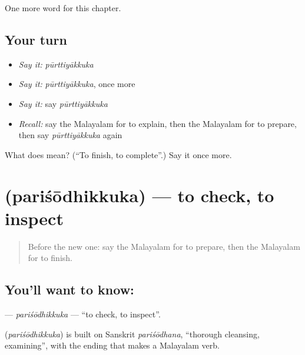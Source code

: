 \begin{grammarlens}[title={What you've built}]
One more word for this chapter.
\end{grammarlens}

\subsection*{Your turn}
\begin{itemize}
\raggedright
  \item \emph{Say it:} \emph{pūrttiyākkuka}
  \item \emph{Say it:} \emph{pūrttiyākkuka}, once more
  \item \emph{Say it:} say \emph{pūrttiyākkuka}
  \item \emph{Recall:} say the Malayalam for to explain, then the Malayalam for to prepare, then say \emph{pūrttiyākkuka} again
\end{itemize}

\begin{tcolorbox}[breakable,colback=teal!4,colframe=teal!35!black,title={Before you move on}]
What does  mean? (\textquotedblleft{}To finish, to complete\textquotedblright{}.) Say it once more.
\end{tcolorbox}
\section[\texorpdfstring{\ml{പരിശോധിക്കുക} (pariśōdhikkuka)}{പരിശോധിക്കുക (pariśōdhikkuka)}]{ (pariśōdhikkuka) — to check, to inspect}

\label{lesson:ML-C226-parisodhikkuka}



\begin{quote}
Before the new one: say the Malayalam for to prepare, then the Malayalam for to finish.
\end{quote}

\subsection*{You'll want to know: }
\textbf{} — \emph{pariśōdhikkuka} — \textquotedblleft{}to check, to inspect\textquotedblright{}.

\begin{cousinweb}
\textbf{} (\emph{pariśōdhikkuka}) is built on Sanskrit \emph{pariśōdhana}, \textquotedblleft{}thorough cleansing, examining\textquotedblright{}, with the ending that makes a Malayalam verb.
\end{cousinweb}

